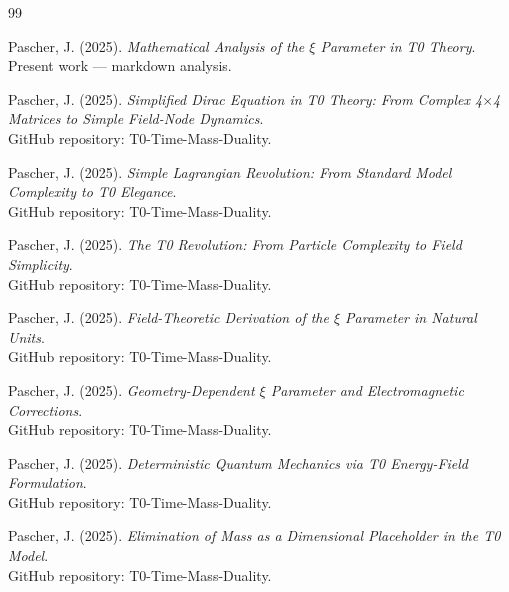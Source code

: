 	\begin{thebibliography}{99}
		
		Pascher, J. (2025). \textit{Mathematical Analysis of the $\xi$ Parameter in T0 Theory}. \\
		Present work --- markdown analysis.
		
		Pascher, J. (2025). \textit{Simplified Dirac Equation in T0 Theory: From Complex 4$\times$4 Matrices to Simple Field-Node Dynamics}. \\
		GitHub repository: T0-Time-Mass-Duality.
		
		Pascher, J. (2025). \textit{Simple Lagrangian Revolution: From Standard Model Complexity to T0 Elegance}. \\
		GitHub repository: T0-Time-Mass-Duality.
		
		Pascher, J. (2025). \textit{The T0 Revolution: From Particle Complexity to Field Simplicity}. \\
		GitHub repository: T0-Time-Mass-Duality.
		
		Pascher, J. (2025). \textit{Field-Theoretic Derivation of the $\xi$ Parameter in Natural Units}. \\
		GitHub repository: T0-Time-Mass-Duality.
		
		Pascher, J. (2025). \textit{Geometry-Dependent $\xi$ Parameter and Electromagnetic Corrections}. \\
		GitHub repository: T0-Time-Mass-Duality.
		
		Pascher, J. (2025). \textit{Deterministic Quantum Mechanics via T0 Energy-Field Formulation}. \\
		GitHub repository: T0-Time-Mass-Duality.
		
		Pascher, J. (2025). \textit{Elimination of Mass as a Dimensional Placeholder in the T0 Model}. \\
		GitHub repository: T0-Time-Mass-Duality.
		
	\end{thebibliography}

